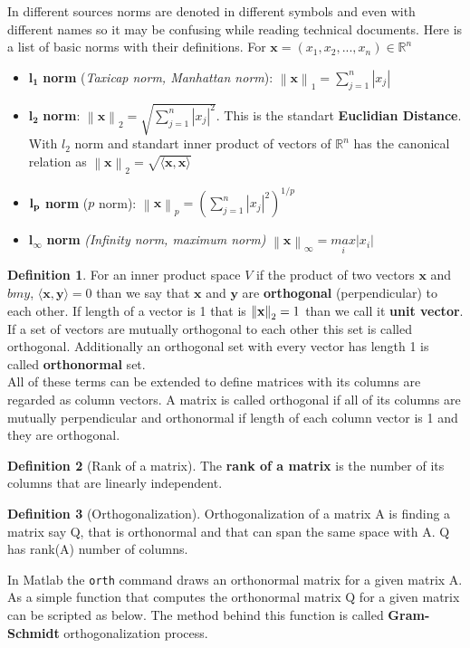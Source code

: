 \documentclass[11pt,a4paper]{article}
\theoremstyle{definition}
\newtheorem{definition}{Definition}[section]
\begin{document}
	
	In different sources norms are denoted in different symbols and even with different names so it may be confusing while reading technical documents. Here is a list of basic norms with their definitions. For $\bm{x} = (x_1, x_2, ... , x_n) \in \mathbb{R}^n$
	\begin{itemize}
		\item $\bm{l_1}$ \textbf{norm} (\textit{Taxicap norm, Manhattan norm}): $\left\| \bm{x}\right\|_1 = \sum_{j=1}^{n} |x_j| $ 
		\item $\bm{l_2}$ \textbf{norm}: $\left\| \bm{x}\right\|_2 = \sqrt{\sum_{j=1}^{n} |x_j|^2} $. This is the standart \textbf{Euclidian Distance}. With $l_2$ norm and standart inner product of vectors of $\mathbb{R}^n$ has the canonical relation as $ \left\| \bm{x}\right\|_2 = \sqrt{ \langle \bm{x,x} \rangle }$
		\item $\bf{l_p}$ \textbf{norm} ($p$ norm): $\left\| \bm{x}\right\|_p = \left( \sum_{j=1}^{n} |x_j|^2 \right)^{1/p} $
		\item $\bm{l_{\infty}}$ \textbf{norm} \textit{(Infinity norm, maximum norm)} $\left\| \bm{x}\right\|_{\infty} = \underset{i}{max} |x_i| $
	\end{itemize}

	\begin{definition}
		For an inner product space $V$ if the product of two vectors $\bm{x}$ and $bm{y}$, $\langle \bm{x,y} \rangle = 0$ than we say that $\bm{x}$ and $\bm{y}$ are \textbf{orthogonal} (perpendicular) to each other. If length of a vector is 1 that is $ \left\|\bf{x} \right\|_2 = 1 $ than we call it \textbf{unit vector}. If a set of vectors are mutually orthogonal to each other this set is called orthogonal. Additionally an orthogonal set with every vector has length 1 is called \textbf{orthonormal} set. \\
		All of these terms can be extended to define matrices with its columns are regarded as column vectors. A matrix is called orthogonal if all of its columns are mutually perpendicular and orthonormal if length of each column vector is 1 and they are orthogonal.
	\end{definition}

	\begin{definition}[Rank of a matrix]
		The \textbf{rank of a matrix} is the number of its columns that are linearly independent.
	\end{definition}
	\begin{definition}[Orthogonalization]
		Orthogonalization of a matrix A is finding a matrix say Q, that is orthonormal and that can span the same space with A. Q has rank(A) number of columns.
	\end{definition}
	In Matlab the \texttt{orth} command draws an orthonormal matrix for a given matrix A. As a simple function that computes the orthonormal matrix Q for a given matrix can be scripted as below. The method behind this function is called \textbf{Gram-Schmidt} orthogonalization process.
	
\end{document}
